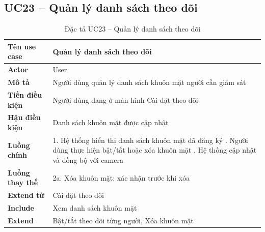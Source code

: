 \subsection*{UC23 -- Quản lý danh sách theo dõi}
\begin{table}[H]
    \captionsetup{justification=raggedright, singlelinecheck=false}
    \caption{Đặc tả UC23 -- Quản lý danh sách theo dõi}
\centering
\begin{tabular}{|p{3.5cm}|p{10cm}|}
\hline
\textbf{Tên use case} & Quản lý danh sách theo dõi \\
\hline
\textbf{Actor} & User \\
\hline
\textbf{Mô tả} & Người dùng quản lý danh sách khuôn mặt
  người cần giám sát \\
\hline
\textbf{Tiền điều kiện} & Người dùng đang ở màn hình
  Cài đặt theo dõi \\
\hline
\textbf{Hậu điều kiện} & Danh sách khuôn mặt được cập nhật \\
\hline
\textbf{Luồng chính} &
  1. Hệ thống hiển thị danh sách khuôn mặt đã đăng ký \newline
  2. Người dùng thực hiện bật/tắt hoặc xóa khuôn mặt \newline
  3. Hệ thống cập nhật và đồng bộ với camera \\
\hline
\textbf{Luồng thay thế} &
  2a. Xóa khuôn mặt: xác nhận trước khi xóa \\
\hline
\textbf{Extend từ} & Cài đặt theo dõi \\
\hline
\textbf{Include} & Xem danh sách khuôn mặt \\
\hline
\textbf{Extend} & Bật/tắt theo dõi từng người, Xóa khuôn mặt \\
\hline
\end{tabular}

\end{table}

